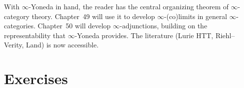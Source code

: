 \begin{remark}
\label{rem:phase2-milestone}
With $\infty$-Yoneda in hand, the reader has the central organizing
theorem of $\infty$-category theory. Chapter~49 will use it to develop
$\infty$-(co)limits in general $\infty$-categories. Chapter~50 will
develop $\infty$-adjunctions, building on the representability that
$\infty$-Yoneda provides. The literature (Lurie HTT, Riehl–Verity, Land)
is now accessible.
\end{remark}


\section{Exercises}
\label{sec:yoneda-exercises}


